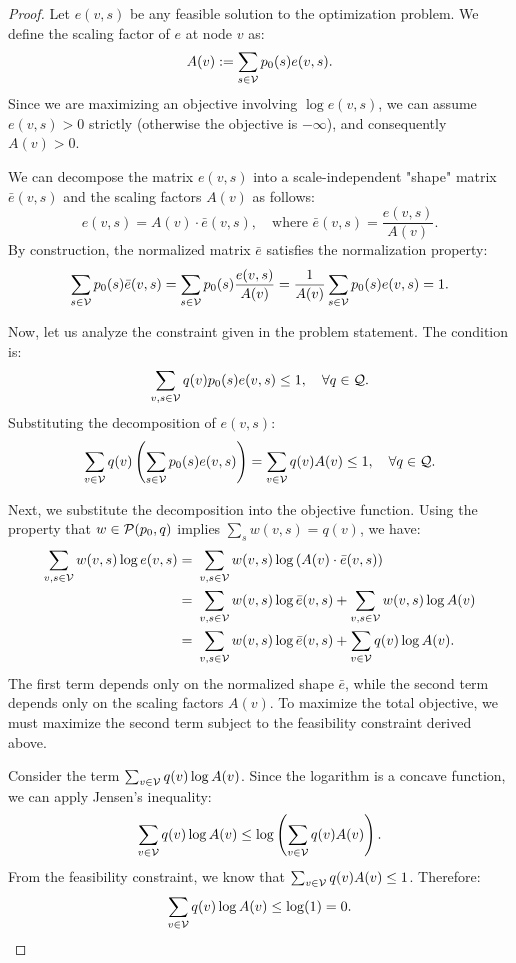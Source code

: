 \begin{proof}
Let $e(v,s)$ be any feasible solution to the optimization problem. We define the scaling factor of $e$ at node $v$ as:
$$A(v) := \sum_{s \in \mathcal{V}} p_0(s) e(v,s).$$
Since we are maximizing an objective involving $\log e(v,s)$, we can assume $e(v,s) > 0$ strictly (otherwise the objective is $-\infty$), and consequently $A(v) > 0$.

We can decompose the matrix $e(v,s)$ into a scale-independent "shape" matrix $\bar{e}(v,s)$ and the scaling factors $A(v)$ as follows:
$$e(v,s) = A(v) \cdot \bar{e}(v,s), \quad \text{where } \bar{e}(v,s) = \frac{e(v,s)}{A(v)}.$$
By construction, the normalized matrix $\bar{e}$ satisfies the normalization property:
$$\sum_{s \in \mathcal{V}} p_0(s) \bar{e}(v,s) = \sum_{s \in \mathcal{V}} p_0(s) \frac{e(v,s)}{A(v)} = \frac{1}{A(v)} \sum_{s \in \mathcal{V}} p_0(s) e(v,s) = 1.$$

Now, let us analyze the constraint given in the problem statement. The condition is:
$$\sum_{v,s \in \mathcal{V}} q(v) p_0(s) e(v,s) \leq 1, \quad \forall q \in \mathcal{Q}.$$
Substituting the decomposition of $e(v,s)$:
$$\sum_{v \in \mathcal{V}} q(v) \left( \sum_{s \in \mathcal{V}} p_0(s) e(v,s) \right) = \sum_{v \in \mathcal{V}} q(v) A(v) \leq 1, \quad \forall q \in \mathcal{Q}.$$

Next, we substitute the decomposition into the objective function. Using the property that $w \in \mathcal{P}(p_0, q)$ implies $\sum_s w(v,s) = q(v)$, we have:
\begin{align*}
\sum_{v,s \in \mathcal{V}} w(v,s) \log e(v,s) = &~ \sum_{v,s \in \mathcal{V}} w(v,s) \log \left( A(v) \cdot \bar{e}(v,s) \right) \\
= &~ \sum_{v,s \in \mathcal{V}} w(v,s) \log \bar{e}(v,s) + \sum_{v,s \in \mathcal{V}} w(v,s) \log A(v) \\
= &~ \sum_{v,s \in \mathcal{V}} w(v,s) \log \bar{e}(v,s) + \sum_{v \in \mathcal{V}} q(v) \log A(v).
\end{align*}
The first term depends only on the normalized shape $\bar{e}$, while the second term depends only on the scaling factors $A(v)$. To maximize the total objective, we must maximize the second term subject to the feasibility constraint derived above.

Consider the term $\sum_{v \in \mathcal{V}} q(v) \log A(v)$. Since the logarithm is a concave function, we can apply Jensen's inequality:
$$ \sum_{v \in \mathcal{V}} q(v) \log A(v) \leq \log \left( \sum_{v \in \mathcal{V}} q(v) A(v) \right). $$
From the feasibility constraint, we know that $\sum_{v \in \mathcal{V}} q(v) A(v) \leq 1$. Therefore:
$$ \sum_{v \in \mathcal{V}} q(v) \log A(v) \leq \log(1) = 0. $$


\end{proof}

